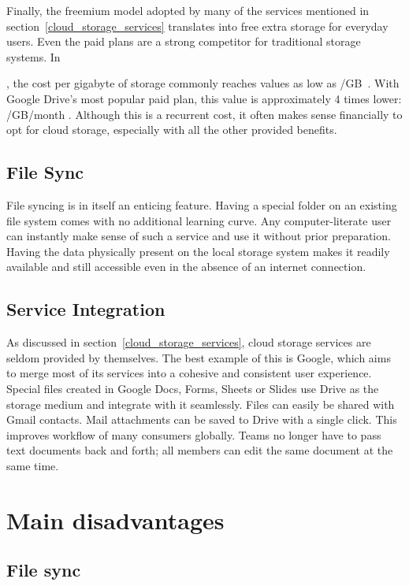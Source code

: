 Finally, the freemium model adopted by many of the services mentioned in section~\ref{cloud_storage_services} translates into free extra storage for everyday users. Even the paid plans are a strong competitor for traditional storage systems. In \date{2018}, the cost per gigabyte of storage commonly reaches values as low as \mbox{\slash GB}~\cite{hard_drive_cost_per_gigabyte}. With Google Drive's most popular paid plan, this value is approximately 4 times lower: \mbox{\slash GB\slash month} \cite{google_drive_pricing}. Although this is a recurrent cost, it often makes sense financially to opt for cloud storage, especially with all the other provided benefits.

\subsection{File Sync}

File syncing is in itself an enticing feature. Having a special folder on an existing file system comes with no additional learning curve. Any computer-literate user can instantly make sense of such a service and use it without prior preparation. Having the data physically present on the local storage system makes it readily available and still accessible even in the absence of an internet connection.

\subsection{Service Integration}

As discussed in section~\ref{cloud_storage_services}, cloud storage services are seldom provided by themselves. The best example of this is Google, which aims to merge most of its services into a cohesive and consistent user experience. Special files created in Google Docs, Forms, Sheets or Slides use Drive as the storage medium and integrate with it seamlessly. Files can easily be shared with Gmail contacts. Mail attachments can be saved to Drive with a single click. This improves workflow of many consumers globally. Teams no longer have to pass text documents back and forth; all members can edit the same document at the same time.

\section{Main disadvantages} \label{main_disadvantages}

\subsection{File sync}

